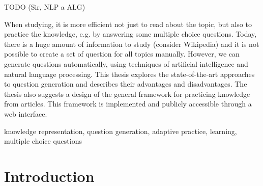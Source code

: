 \documentclass[a4paper, 12pt, twoside]{fithesis2}		%
\renewcommand{\_}{\leavevmode \kern0.07em\vbox{\hrule width0.4em}}
\newcounter{choice}
\begin{document}
\FrontMatter
\ThesisTitlePage

\begin{ThesisDeclaration}
\DeclarationText
\AdvisorName
\end{ThesisDeclaration}

\begin{ThesisThanks}

  TODO (Sir, NLP a ALG)


\end{ThesisThanks}

\begin{ThesisAbstract}
When studying, it is more efficient not just to read about the topic, but also to practice the knowledge, e.g. by answering some multiple choice questions. Today, there is a huge amount of information to study (consider Wikipedia) and it is not possible to create a set of question for all topics manually. However, we can generate questions automatically, using techniques of artificial intelligence and natural language processing. This thesis explores the state-of-the-art approaches to question generation and describes their advantages and disadvantages. The thesis also suggests a design of the general framework for practicing knowledge from articles. This framework is implemented and publicly accessible through a web interface.
\end{ThesisAbstract}

\begin{ThesisKeyWords}
knowledge representation, question generation, adaptive practice, learning,
multiple choice questions
\end{ThesisKeyWords}

\MainMatter
\tableofcontents

\chapter{Introduction}
\label{chap:intro}
\end{document}
